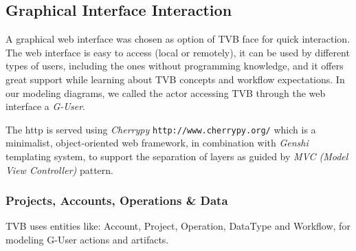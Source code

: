 
\subsection{Graphical Interface Interaction}

A graphical web interface was chosen as option of TVB face for quick interaction. The web interface is easy to access (local or remotely),
it can be used by different types of users, including the ones without programming knowledge, and it offers great 
support while learning about TVB concepts and workflow expectations. 
In our modeling diagrams, we called the actor accessing TVB through the web interface a \emph{G-User}.

The http is served using \emph{Cherrypy} \texttt{http://www.cherrypy.org/} which is a minimalist, object-oriented web framework, 
in combination with \emph{Genshi} templating system, to support the separation of layers as guided by \emph{MVC (Model View Controller)} pattern.

	\subsubsection{Projects, Accounts, Operations \& Data}

TVB uses entities like: Account, Project, Operation, DataType and Workflow, for modeling G-User actions and artifacts. 

